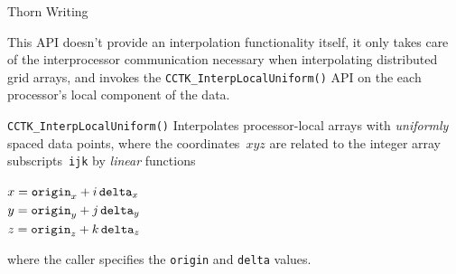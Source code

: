 \begin{cactuspart}{Thorn Writing}
\begin{Lentry}
        This API doesn't provide an interpolation functionality itself,
        it only takes care of the interprocessor communication
        necessary when interpolating distributed grid arrays, and invokes
        the \texttt{CCTK\_InterpLocalUniform()} API on the each processor's
        local component of the data.
\item[\texttt{CCTK\_InterpLocalUniform()}]
        Interpolates processor-local arrays with \emph{uniformly}
        spaced data points, \ie{} where the coordinates~$xyz$
        are related to the integer array subscripts~\verb|ijk| by
        \emph{linear} functions
        \begin{flushleft}
        $x = \mbox{\mbox{\texttt{origin}}}_x + i \, \mbox{\mbox{\texttt{delta}}}_x$ \\
        $y = \mbox{\mbox{\texttt{origin}}}_y + j \, \mbox{\mbox{\texttt{delta}}}_y$ \\
        $z = \mbox{\mbox{\texttt{origin}}}_z + k \, \mbox{\mbox{\texttt{delta}}}_z$ %
        \end{flushleft}
        where the caller specifies the \verb|origin| and \verb|delta|
        values.
\end{Lentry}


\end{cactuspart}
